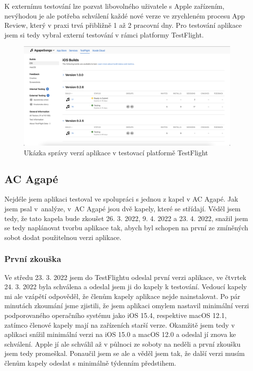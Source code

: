 K externímu testování lze pozvat libovolného uživatele s Apple zařízením, nevýhodou je ale potřeba schválení každé nové verze ve zrychleném procesu App Review, který v praxi trvá přibližně 1 až 2 pracovní dny. Pro testování aplikace jsem si tedy vybral externí testování v rámci platformy TestFlight.

\begin{figure}[H]
    \includegraphics[width=\textwidth]{images/6-testovani/6-5-testflight-verze.png}
    \caption{Ukázka správy verzí aplikace v testovací platformě TestFlight}
\end{figure}

\subsection{AC Agapé}

Nejdéle jsem aplikaci testoval ve spolupráci s jednou z kapel v AC Agapé. Jak jsem psal v~analýze, v~AC Agapé jsou dvě kapely, které se střídají. Věděl jsem tedy, že tato kapela bude zkoušet 26. 3. 2022, 9. 4. 2022 a 23. 4. 2022, snažil jsem se tedy naplánovat tvorbu aplikace tak, abych byl schopen na první ze zmíněných sobot dodat použitelnou verzi aplikace.

\subsubsection{První zkouška}

Ve středu 23. 3. 2022 jsem do TestFlightu odeslal první verzi aplikace, ve čtvrtek 24. 3. 2022 byla schválena a odeslal jsem ji do kapely k testování. Vedoucí kapely mi ale vzápětí odpověděl, že členům kapely aplikace nejde nainstalovat. Po pár minutách zkoumání jsme zjistili, že jsem aplikaci omylem nastavil minimální verzi podporovaného operačního systému jako iOS 15.4, respektive macOS 12.1, zatímco členové kapely mají na zařízeních starší verze. Okamžitě jsem tedy v aplikaci snížil minimální verzi na iOS 15.0 a macOS 12.0 a odeslal jí znova ke schválení. Apple jí ale schválil až v půlnoci ze soboty na neděli a první zkoušku jsem tedy promeškal. Ponaučil jsem se ale a věděl jsem tak, že další verzi musím členům kapely odeslat s minimálně týdenním předstihem.

